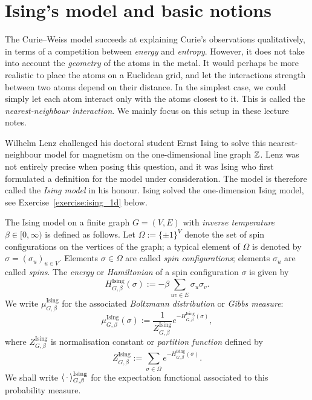 \section{Ising's model and basic notions}
\label{sec:ising_1d}

The Curie--Weiss model succeeds at explaining Curie's observations qualitatively,
in terms of a competition between \emph{energy} and \emph{entropy}.
However, it does not take into account the \emph{geometry} of the atoms in the metal.
It would perhaps be more realistic to place the atoms on a Euclidean grid,
and let the interactions strength between two atoms depend on their distance.
In the simplest case, we could simply let each atom interact only with the atoms
closest to it. This is called the \emph{nearest-neighbour interaction}.
We mainly focus on this setup in these lecture notes.

Wilhelm Lenz challenged his doctoral student Ernst Ising
to solve this nearest-neighbour model for magnetism on the one-dimensional line graph $\mathbb Z$.
Lenz was not entirely precise when posing this question,
and it was Ising who first formulated a definition for the model under consideration.
The model is therefore called the \emph{Ising model} in his honour.
Ising solved the one-dimension Ising model, see Exercise~\ref{exercise:ising_1d} below.

\begin{definition}
    \label{def:ising_finite}
    The Ising model on a finite graph \( G = (V, E) \) with \emph{inverse temperature} \(
    \beta \in [0,\infty) \) is defined as follows.
    Let $\Omega:=\{\pm1\}^V$ denote the set of spin configurations on the vertices of the graph;
    a typical element of $\Omega$ is denoted by $\sigma=(\sigma_u)_{u\in V}$.
    Elements $\sigma\in\Omega$ are called \emph{spin configurations};
    elements $\sigma_u$ are called \emph{spins}.
    The \emph{energy} or \emph{Hamiltonian} of a spin configuration $\sigma$ is given by
    \[
        H_{G,\beta}^{\operatorname{Ising}}(\sigma) := -\beta \sum_{uv \in E} \sigma_u \sigma_v.
    \]
    We write $\mu_{G,\beta}^{\operatorname{Ising}}$ for the associated \emph{Boltzmann
    distribution} or \emph{Gibbs measure}:
    \[
        \mu_{G,\beta}^{\operatorname{Ising}}(\sigma) :=
        \frac{1}{Z_{G,\beta}^{\operatorname{Ising}}}
        e^{-H^{\operatorname{Ising}}_{G,\beta}(\sigma)},
    \]
    where \(Z_{G,\beta}^{\operatorname{Ising}}\) is normalisation constant or
    \emph{partition function} defined by
    \[
        Z_{G,\beta}^{\operatorname{Ising}}:= \sum_{\sigma\in\Omega}
        e^{-H^{\operatorname{Ising}}_{G,\beta}(\sigma)}.
    \]
    We shall write $\langle\,\cdot\,\rangle_{G,\beta}^{\operatorname{Ising}}$ for the
    expectation functional associated to this probability measure.
\end{definition}

